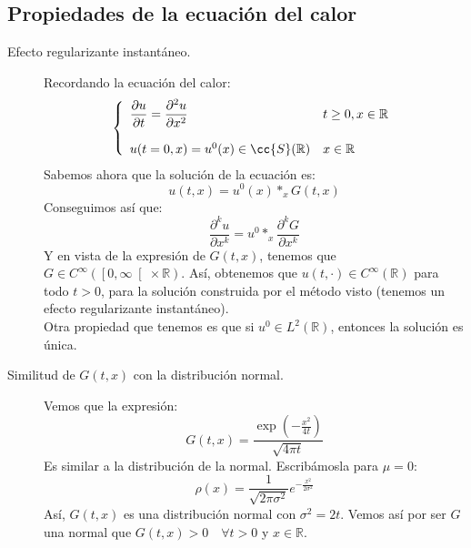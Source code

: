 \subsection{Propiedades de la ecuación del calor}
\begin{description}
    \item [Efecto regularizante instantáneo.] Recordando la ecuación del calor:
        \begin{equation*}
            \left\{\begin{array}{ll}
                    \displaystyle \frac{\partial u}{\partial t} = \frac{\partial^2 u}{\partial x^2} & t\geq 0, x\in \mathbb{R} \\ \\
                    u(t=0,x) = u^0(x) \in \cc{S}(\mathbb{R}) & x\in \mathbb{R}
            \end{array}\right.
        \end{equation*}
        Sabemos ahora que la solución de la ecuación es:
        \begin{equation*}
            u(t,x) = u^0(x) \ast_x G(t,x)
        \end{equation*}
        Conseguimos así que:
        \begin{equation*}
            \frac{\partial^k u}{\partial x^k} = u^0 \ast_x \frac{\partial^k G}{\partial x^k}
        \end{equation*}
        Y en vista de la expresión de $G(t,x)$, tenemos que $G\in C^\infty(\left[0,\infty\right[\times \mathbb{R})$. Así, obtenemos que $u(t,\cdot )\in C^\infty(\mathbb{R})$ para todo $t>0$, para la solución construida por el método visto (tenemos un efecto regularizante instantáneo).\\

        \noindent
        Otra propiedad que tenemos es que si $u^0\in L^2(\mathbb{R})$, entonces la solución es única. 
    \item [Similitud de $G(t,x)$ con la distribución normal.] Vemos que la expresión:
        \begin{equation*}
            G(t,x) = \frac{\exp\left(-\frac{x^2}{4t}\right)}{\sqrt{4\pi t}}
        \end{equation*}
        Es similar a la distribución de la normal. Escribámosla para $\mu = 0$:
        \begin{equation*}
            \rho(x) = \frac{1}{\sqrt{2\pi \sigma^2}} e^{-\frac{x^2}{2\sigma^2}}
        \end{equation*}
        Así, $G(t,x)$ es una distribución normal con $\sigma^2 = 2t$. Vemos así por ser $G$ una normal que $G(t,x)>0\quad \forall t>0$ y $x\in \mathbb{R}$.


\end{description}
